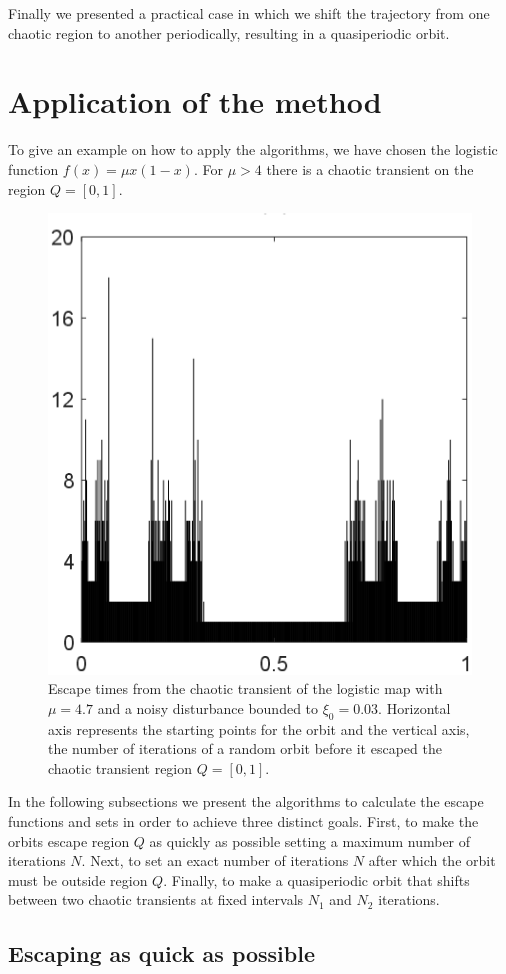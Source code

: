 Finally we presented a practical case in which we shift the trajectory from one chaotic region to another periodically, resulting in a quasiperiodic orbit.

\section{Application of the method}

To give an example on how to apply the algorithms, we have chosen the logistic function $f(x) = \mu x(1-x)$. For $\mu > 4$ there is a chaotic transient on the region $Q=[0,1]$. 

\begin{figure}
    \centering
    \includegraphics[width=0.5\linewidth]{Images/P1/EscapeTimes.eps}
    \caption{Escape times from the chaotic transient of the logistic map with $\mu=4.7$ and a noisy disturbance bounded to $\xi_0 = 0.03$. Horizontal axis represents the starting points for the orbit and the vertical axis, the number of iterations of a random orbit before it escaped the chaotic transient region $Q = [0,1]$.}
    \label{fig:EscapeTimes}
\end{figure}

In the following subsections we present the algorithms to calculate the escape functions and sets in order to achieve three distinct goals. First, to make the orbits escape region $Q$ as quickly as possible setting a maximum number of iterations $N$. Next, to set an exact number of iterations $N$ after which the orbit must be outside region $Q$. Finally, to make a quasiperiodic orbit that shifts between two chaotic transients at fixed intervals $N_1$ and $N_2$ iterations. 

\subsection{Escaping as quick as possible}

